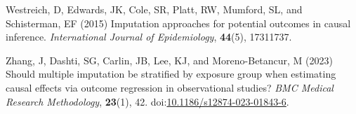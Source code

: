 \documentclass[
  singlecolumn,
  9pt]{article}
\newlength{\cslhangindent}
\newenvironment{CSLReferences}[2] %
 {\begin{list}{}{%
  \setlength{\itemindent}{0pt}
  \setlength{\leftmargin}{0pt}
  \setlength{\parsep}{0pt}
  \ifodd #1
   \setlength{\leftmargin}{\cslhangindent}
   \setlength{\itemindent}{-1\cslhangindent}
  \fi
  \setlength{\itemsep}{#2\baselineskip}}}
 {\end{list}}
\begin{document}
\begin{CSLReferences}{1}{0}
Westreich, D, Edwards, JK, Cole, SR, Platt, RW, Mumford, SL, and
Schisterman, EF (2015) Imputation approaches for potential outcomes in
causal inference. \emph{International Journal of Epidemiology},
\textbf{44}(5), 17311737.

Zhang, J, Dashti, SG, Carlin, JB, Lee, KJ, and Moreno-Betancur, M (2023)
Should multiple imputation be stratified by exposure group when
estimating causal effects via outcome regression in observational
studies? \emph{BMC Medical Research Methodology}, \textbf{23}(1), 42.
doi:\href{https://doi.org/10.1186/s12874-023-01843-6}{10.1186/s12874-023-01843-6}.

\end{CSLReferences}
\end{document}
